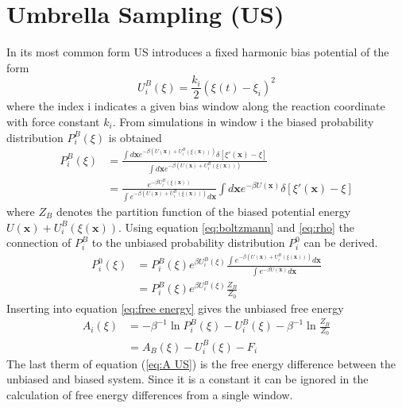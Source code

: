 \section{Umbrella Sampling (US)}
In its most common form US introduces a fixed harmonic bias potential of the form
\begin{equation}
  U_i^B(\xi) = \frac{k_i}{2}(\xi(t)-\xi_i)^2 \label{eq:US bias}
\end{equation}
where the index i indicates a given bias window along the reaction coordinate with force constant $k_i$.\autocite{kastner2011umbrella} From simulations in window i the biased probability distribution $P_i^B(\xi)$ is obtained
\begin{equation}
\begin{split}
  P_i^B(\xi) &= \frac{\int d\textbf{x} e^{-\beta (U(\textbf{x})+U_i^B(\xi(\textbf{x})))}\delta[\xi'(\textbf{x})-\xi]}
  {\int d\textbf{x} e^{-\beta (U(\textbf{x})+U_i^B(\xi(\textbf{x})))}} \\
             &= \frac{e^{-\beta U_i^B(\xi(\textbf{x}))}}{\int e^{-\beta (U(\textbf{x})+U_i^B(\xi(\textbf{x})))}d\textbf{x}} \int d\textbf{x} e^{-\beta U(\textbf{x})}\delta[\xi'(\textbf{x})-\xi]
\end{split}
\end{equation}
where $Z_B$ denotes the partition function of the biased potential energy $U(\textbf{x})+U_i^B(\xi(\textbf{x}))$.
Using equation \ref{eq:boltzmann} and \ref{eq:rho} the connection of $P_i^B$ to the unbiased probability distribution $P_i^0$ can be derived.
\begin{equation}
\begin{split}
  P_i^0(\xi) &= P_i^B(\xi)e^{\beta U_i^B(\xi)}\frac{\int e^{-\beta (U(\textbf{x})+U_i^B(\xi(\textbf{x})))}d\textbf{x}} {\int e^{-\beta U(\textbf{x})}d\textbf{x}} \\
  &= P_i^B(\xi)e^{\beta U_i^B(\xi)}\frac{Z_B}{Z_0}
\end{split}
\end{equation}
Inserting into equation \ref{eq:free energy} gives the unbiased free energy
\begin{equation}
  \begin{split}
  A_i(\xi) &= -\beta^{-1}\ln P_i^B(\xi) - U_i^B(\xi) - \beta^{-1}\ln\frac{Z_B}{Z_0} \\
           &= A_B(\xi) - U_i^B(\xi) - F_i \label{eq:A US}
  \end{split}
\end{equation}
The last therm of equation (\ref{eq:A US}) is the free energy difference between the unbiased and biased system. Since it is a constant it can be ignored in the calculation of free energy differences from a single window.

